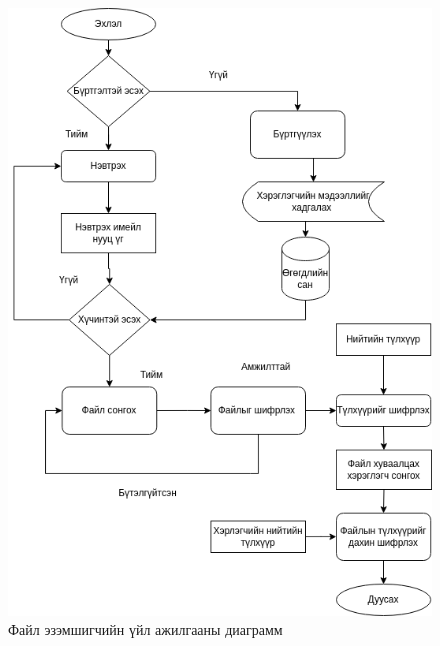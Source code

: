 \begin{figure}[H]
    \centering
    \includegraphics[scale=0.4]{Figures/system_schemes/delegator.drawio.png}
    \caption{Файл эзэмшигчийн үйл ажилгааны диаграмм}
    \label{fig:delegator_diagram}
\end{figure}

